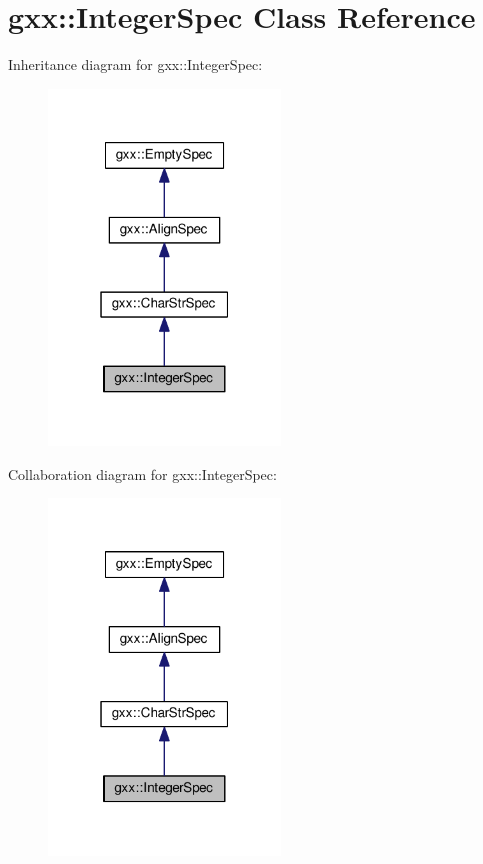 \hypertarget{classgxx_1_1IntegerSpec}{}\section{gxx\+:\+:Integer\+Spec Class Reference}
\label{classgxx_1_1IntegerSpec}


Inheritance diagram for gxx\+:\+:Integer\+Spec\+:
\nopagebreak
\begin{figure}[H]
\begin{center}
\leavevmode
\includegraphics[width=175pt]{classgxx_1_1IntegerSpec__inherit__graph}
\end{center}
\end{figure}


Collaboration diagram for gxx\+:\+:Integer\+Spec\+:
\nopagebreak
\begin{figure}[H]
\begin{center}
\leavevmode
\includegraphics[width=175pt]{classgxx_1_1IntegerSpec__coll__graph}
\end{center}
\end{figure}
